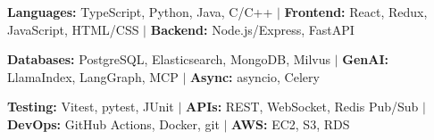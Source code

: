 \item\small{\textbf{Languages:} TypeScript, Python, Java, C/C++ $|$ \textbf{Frontend:} React, Redux, JavaScript, HTML/CSS $|$ \textbf{Backend:} Node.js/Express, FastAPI}
\item\small{\textbf{Databases:} PostgreSQL, Elasticsearch, MongoDB, Milvus $|$ \textbf{GenAI:} LlamaIndex, LangGraph, MCP $|$ \textbf{Async:} asyncio, Celery}
\item\small{\textbf{Testing:} Vitest, pytest, JUnit $|$ \textbf{APIs:} REST, WebSocket, Redis Pub/Sub $|$ \textbf{DevOps:} GitHub Actions, Docker, git $|$ \textbf{AWS:} EC2, S3, RDS}%